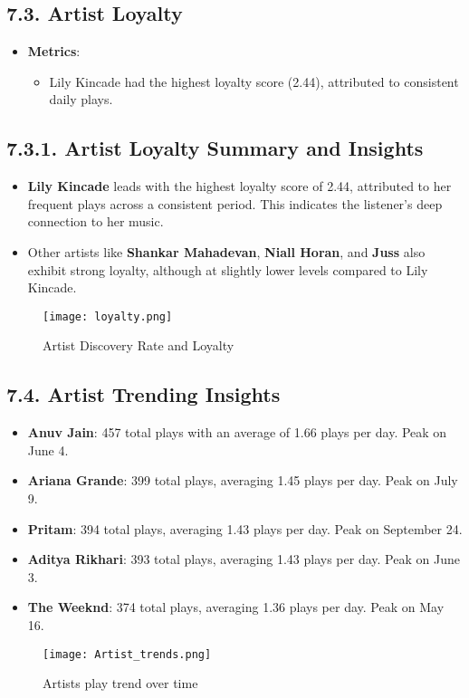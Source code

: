\documentclass[12pt]{article}
\begin{document}
\begin{itemize}
\subsection*{7.3. Artist Loyalty}
\begin{itemize}
    \item \textbf{Metrics}:
    \begin{itemize}
        \item Lily Kincade had the highest loyalty score (2.44), attributed to consistent daily plays.
    \end{itemize}
\end{itemize}

\subsection*{7.3.1. Artist Loyalty Summary and Insights}
\begin{itemize}
    \item \textbf{Lily Kincade} leads with the highest loyalty score of 2.44, attributed to her frequent plays across a consistent period. This indicates the listener's deep connection to her music.
    \item Other artists like \textbf{Shankar Mahadevan}, \textbf{Niall Horan}, and \textbf{Juss} also exhibit strong loyalty, although at slightly lower levels compared to Lily Kincade.
\end{itemize}

\begin{figure}[H]
    \centering
    \texttt{[image: loyalty.png]}
    \caption{Artist Discovery Rate and Loyalty}
    \label{fig:enter-label}
\end{figure}
\subsection*{7.4. Artist Trending Insights}
\begin{itemize}
    \item \textbf{Anuv Jain}: 457 total plays with an average of 1.66 plays per day. Peak on June 4.
    \item \textbf{Ariana Grande}: 399 total plays, averaging 1.45 plays per day. Peak on July 9.
    \item \textbf{Pritam}: 394 total plays, averaging 1.43 plays per day. Peak on September 24.
    \item \textbf{Aditya Rikhari}: 393 total plays, averaging 1.43 plays per day. Peak on June 3.
    \item \textbf{The Weeknd}: 374 total plays, averaging 1.36 plays per day. Peak on May 16.
\end{itemize}
\begin{figure}[H]
    \centering
    \texttt{[image: Artist\_trends.png]}
    \caption{Artists play trend over time}
    \label{fig:enter-label}
\end{figure}

\end{itemize}
\end{document}
